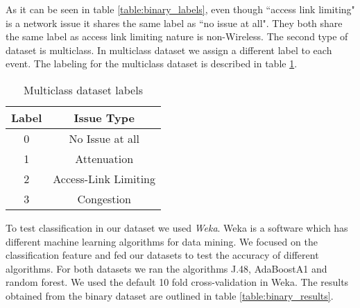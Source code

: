 As it can be seen in table \ref{table:binary_labels}, even though ``access link limiting" is a network issue it shares the same label as ``no issue at all". They both share the same label as access link limiting nature is non-Wireless.
The second type of dataset is multiclass. In multiclass dataset we assign a different label to each event. The labeling for the multiclass dataset is described in table \ref{table:multiclass_labels}.

\begin{table}[h!]
	\begin{center}
		\begin{tabular}{||c c||} 
			\hline
			Label & Issue Type\\ [0.5ex] 
			\hline\hline
			0 & No Issue at all \\ 
			\hline
			1 & Attenuation\\
			\hline
			2 & Access-Link Limiting \\
			\hline
			3 & Congestion \\[1ex] 
			\hline
		\end{tabular}
		\caption{Multiclass dataset labels}
		\label{table:multiclass_labels}
	\end{center}
\end{table}

To test classification in our dataset we used \emph{Weka}. Weka is a software which has different machine learning algorithms for data mining. We focused on the classification feature and fed our datasets to test the accuracy of different algorithms. For both datasets we ran the algorithms J.48, AdaBoostA1 and random forest. We used the default 10 fold cross-validation in Weka. The results obtained from the binary dataset are outlined in table \ref{table:binary_results}. 






